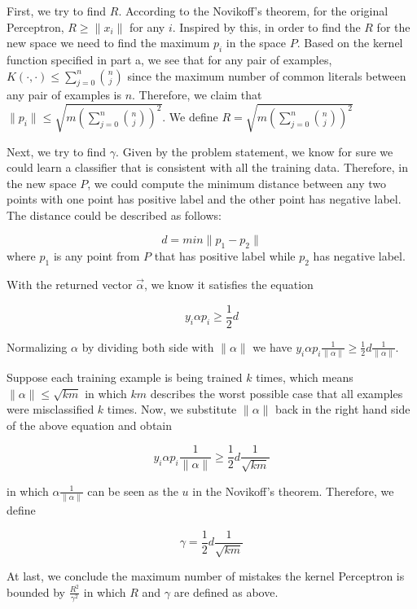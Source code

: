 First, we try to find $R$. According to the Novikoff's theorem, for the original Perceptron, $R \geq \|x_i\|$ for any $i$. Inspired by this, in order to find the $R$ for the new space we need to find the maximum $p_i$ in the space $P$. Based on the kernel function specified in part a, we see that for any pair of examples, $K(\cdot,\cdot) \leq \sum_{j=0}^{n}{n \choose j}$ since the maximum number of common literals between any pair of examples is $n$. Therefore, we claim that $\|p_i\| \leq \sqrt{m ( \sum_{j=0}^{n}{n \choose j} ) ^2}$. We define $R = \sqrt{m ( \sum_{j=0}^{n}{n \choose j} ) ^2}$

Next, we try to find $\gamma$. Given by the problem statement, we know for sure we could learn a classifier that is consistent with all the training data. Therefore, in the new space $P$, we could compute the minimum distance between any two points with one point has positive label and the other point has negative label. The distance could be described as follows:

\begin{equation}
d = min \|p_1 - p_2\|
\end{equation}
where $p_1$ is any point from $P$ that has positive label while $p_2$ has negative label.

With the returned vector $\vec{\alpha}$, we know it satisfies the equation

\begin{equation}
y_i \alpha p_i\geq \frac{1}{2}d
\end{equation}

Normalizing $\alpha$ by dividing both side with $\|\alpha\|$ we have $y_i \alpha p_i \frac{1}{\|\alpha\|} \geq \frac{1}{2}d\frac{1}{\|\alpha\|}$.

Suppose each training example is being trained $k$ times, which means $\|\alpha\| \leq \sqrt{km}$ in which $km$ describes the worst possible case that all examples were misclassified $k$ times. Now, we substitute $\|\alpha\|$ back in the right hand side of the above equation and obtain

\begin{equation}
y_i \alpha p_i \frac{1}{\|\alpha\|} \geq \frac{1}{2}d\frac{1}{\sqrt{km}}
\end{equation}

in which $\alpha \frac{1}{\|\alpha\|}$ can be seen as the $u$ in the Novikoff's theorem. Therefore, we define

\begin{equation}
\gamma = \frac{1}{2}d\frac{1}{\sqrt{km}}
\end{equation}

At last, we conclude the maximum number of mistakes the kernel Perceptron is bounded by $\frac{R^2}{\gamma^2}$ in which $R$ and $\gamma$ are defined as above.







